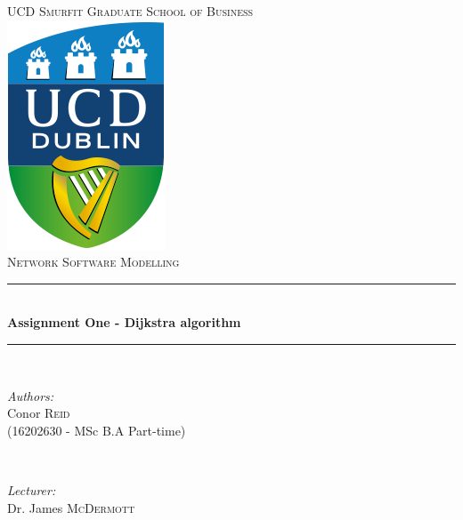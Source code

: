 \documentclass[paper=a4, fontsize=11pt]{scrartcl} %
\begin{document}
\begin{titlepage}

\newcommand{\HRule}{\rule{\linewidth}{0.5mm}} %

\center %


\textsc{\LARGE UCD Smurfit Graduate School of Business}\\[1.5cm] %
\includegraphics[scale = 0.6]{images/logo.png} \\ [1cm]
\textsc{\Large Network Software Modelling}\\[0.5cm] %


\HRule \\[0.4cm]
{ \LARGE \bfseries Assignment One - Dijkstra algorithm}\\[0.4cm] %
\HRule \\[1.5cm]


\begin{minipage}{0.4\textwidth}
\begin{flushleft} \large
\emph{Authors:}\\
\small{Conor \textsc{Reid}\\ (16202630 - MSc B.A Part-time)} %
\end{flushleft}
\end{minipage}
~
\begin{minipage}{0.4\textwidth}
\begin{flushright} \large
\emph{Lecturer:} \\
Dr. James \textsc{McDermott} %
\end{flushright}
\end{minipage}\\[4cm]


\end{titlepage}
\end{document}

